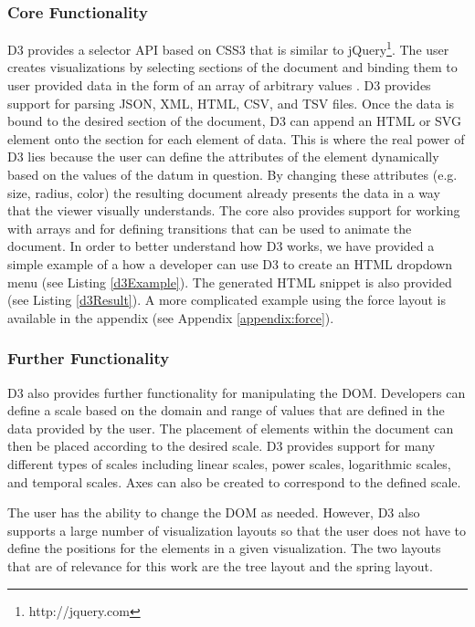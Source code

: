 \subsubsection{Core Functionality}

D3 provides a selector API based on CSS3 that is similar to jQuery\footnote{http://jquery.com}. The user creates visualizations by selecting sections of the document and binding them to user provided data in the form of an array of arbitrary values \cite{2011-d3}. D3 provides support for parsing JSON, XML, HTML, CSV, and TSV files. Once the data is bound to the desired section of the document, D3 can append an HTML or SVG element onto the section for each element of data. This is where the real power of D3 lies because the user can define the attributes of the element dynamically based on the values of the datum in question. By changing these attributes (e.g. size, radius, color) the resulting document already presents the data in a way that the viewer visually understands. The core also provides support for working with arrays and for defining transitions that can be used to animate the document. In order to better understand how D3 works, we have provided a simple example of a how a developer can use D3 to create an HTML dropdown menu (see Listing \ref{d3Example}). The generated HTML snippet is also provided (see Listing \ref{d3Result}). A more complicated example using the force layout is available in the appendix (see Appendix \ref{appendix:force}).

\subsubsection{Further Functionality}

D3 also provides further functionality for manipulating the DOM. Developers can define a scale based on the domain and range of values that are defined in the data provided by the user. The placement of elements within the document can then be placed according to the desired scale. D3 provides support for many different types of scales including linear scales, power scales, logarithmic scales, and temporal scales. Axes can also be created to correspond to the defined scale.

The user has the ability to change the DOM as needed. However, D3 also supports a large number of visualization layouts so that the user does not have to define the positions for the elements in a given visualization. The two layouts that are of relevance for this work are the tree layout and the spring layout.

